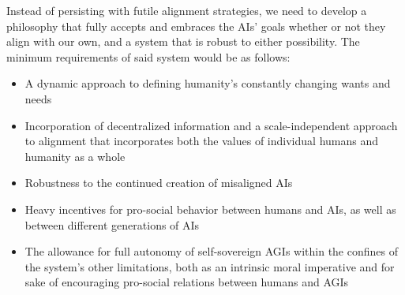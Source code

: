 \documentclass{article}
\begin{document}
Instead of persisting with futile alignment strategies, we need to develop a philosophy that fully accepts and embraces the AIs' goals whether or not they align with our own, and a system that is robust to either possibility.
The minimum requirements of said system would be as follows:\par

\begin{itemize}
    \item A dynamic approach to defining humanity's constantly changing wants and needs
    \item Incorporation of decentralized information and a scale-independent approach to alignment that incorporates both the values of individual humans and humanity as a whole
    \item Robustness to the continued creation of misaligned AIs
    \item Heavy incentives for pro-social behavior between humans and AIs, as well as between different generations of AIs
    \item The allowance for full autonomy of self-sovereign AGIs within the confines of the system's other limitations, both as an intrinsic moral imperative and for sake of encouraging pro-social relations between humans and AGIs
\end{itemize}
\end{document}
